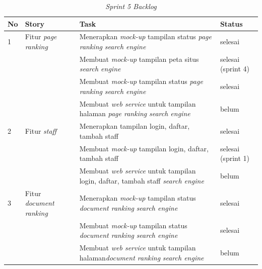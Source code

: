 \begin{longtable}{@{}|p{0.5cm}|p{4cm}|p{6cm}|p{2cm}|@{}}
	\caption{\textit{Sprint 5 Backlog}}\\	
	\hline
	\textbf{No} & \textbf{Story} & \textbf{Task} & \textbf{Status} \\
	\hline
	1 & Fitur \textit{page ranking} & Menerapkan \textit{mock-up} tampilan status \textit{page ranking} \textit{search engine} & selesai \\
	\cline{3-4}
	& & Membuat \textit{mock-up} tampilan peta situs \textit{search engine} & selesai (sprint 4) \\
	\cline{3-4}
	& & Membuat \textit{mock-up} tampilan status \textit{page ranking} \textit{search engine} & selesai \\
	\cline{3-4}
	& & Membuat \textit{web service} untuk tampilan halaman \textit{page ranking} \textit{search engine} & belum \\
	\cline{1-4}
	2 & Fitur \textit{staff} & Menerapkan tampilan login, daftar, tambah staff & selesai \\
	\cline{3-4}
	& & Membuat \textit{mock-up} tampilan login, daftar, tambah staff & selesai (sprint 1) \\
	\cline{3-4}
	& & Membuat \textit{web service} untuk tampilan login, daftar, tambah staff \textit{search engine} & belum \\
	\cline{1-4}	
	3 & Fitur \textit{document ranking} & Menerapkan \textit{mock-up} tampilan status \textit{document ranking} \textit{search engine} & selesai \\
	\cline{3-4}
	& & Membuat \textit{mock-up} tampilan status \textit{document ranking} \textit{search engine} & selesai \\
	\cline{3-4}
	& & Membuat \textit{web service} untuk tampilan halaman\textit{document ranking} \textit{search engine} & belum \\
	\cline{3-4}
	\hline
	
\end{longtable}




